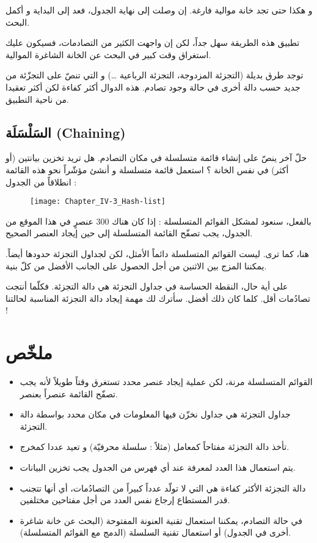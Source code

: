 و هكذا حتى تجد خانة موالية فارغة. إن وصلت إلى نهاية الجدول، فعد إلى البداية و أكمل البحث.

تطبيق هذه الطريقة سهل جداً، لكن إن واجهت الكثير من التصادمات، فسيكون عليك استغراق وقت كبير في البحث عن الخانة الشاغرة الموالية.

توجد طرق بديلة (التجزئة المزدوجة، التجزئة الرباعية \dots) و التي تنصّ على التجزّئة من جديد حسب دالة أخرى في حالة وجود تصادم. هذه الدوال أكثر كفاءة لكن أكثر تعقيدا من ناحية التطبيق.

\subsection{السَلْسَلَة (\textenglish{Chaining})}

حلّ آخر ينصّ على إنشاء قائمة متسلسلة في مكان التصادم. هل تريد تخزين بيانتين (أو أكثر) في نفس الخانة ؟ استعمل قائمة متسلسلة و أنشئ مؤشّراً نحو هذه القائمة انطلاقاً من الجدول :

\begin{figure}[H]
	\centering
	\texttt{[image: Chapter\_IV-3\_Hash-list]}
\end{figure}

بالفعل، سنعود لمشكل القوائم المتسلسلة : إذا كان هناك 300 عنصرٍ في هذا الموقع من الجدول، يجب تصفّح القائمة المتسلسلة إلى حين إيجاد العنصر الصحيح.

هنا، كما ترى. ليست القوائم المتسلسلة دائماً الأمثل، لكن لجداول التجزئة حدودها أيضاً. يمكننا المزج بين الاثنين من أجل الحصول على الجانب الأفضل من كلّ بنية.

على أية حال، النقطة الحساسة في جداول التجزئة هي دالة التجزئة. فكلّما أنتجت تصادُمات أقل. كلما كان ذلك أفضل.
سأترك لك مهمة إيجاد دالة التجزئة المناسبة لحالتنا !

\section*{ملخّص}

\begin{itemize}
	\item القوائم المتسلسلة مرنة، لكن عملية إيجاد عنصر محدد تستغرق وقتاً طويلاً لأنه يجب تصفّح القائمة عنصراً بعنصر.
	\item جداول التجزئة هي جداول نخزّن فيها المعلومات في مكان محدد بواسطة دالة التجزئة.
	\item تأخذ دالة التجزئة مفتاحاً كمعامل (مثلاً : سلسلة محرفيّة) و تعيد عددا كمخرج.
	\item يتم استعمال هذا العدد لمعرفة عند أي فهرس من الجدول يجب تخزين البيانات.
	\item دالة التجزئة الأكثر كفاءة هي التي لا تولّد عدداً كبيراً من التصادُمات، أي أنها تتجنب قدر المستطاع إرجاع نفس العدد من أجل مفتاحين مختلفين.
	\item في حالة التصادم، يمكننا استعمال تقنية العنونة المفتوحة (البحث عن خانة شاغرة أخرى في الجدول) أو استعمال تقنية السلسلة (الدمج مع القوائم المتسلسلة).
\end{itemize}
